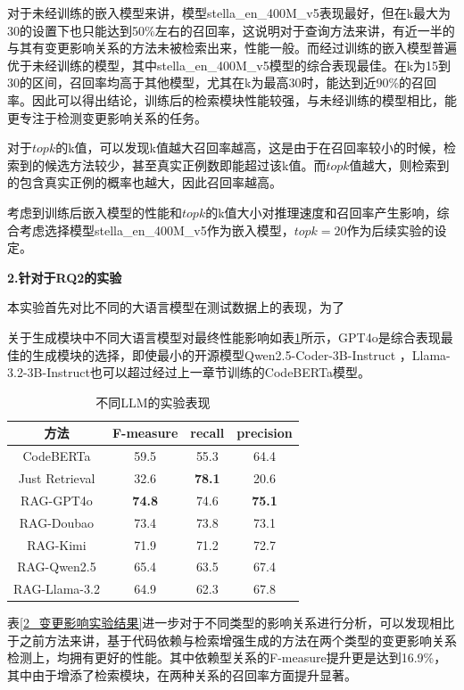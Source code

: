 对于未经训练的嵌入模型来讲，模型stella\_en\_400M\_v5表现最好，但在k最大为30的设置下也只能达到50\%左右的召回率，这说明对于查询方法来讲，有近一半的与其有变更影响关系的方法未被检索出来，性能一般。而经过训练的嵌入模型普遍优于未经训练的模型，其中stella\_en\_400M\_v5模型的综合表现最佳。在k为15到30的区间，召回率均高于其他模型，尤其在k为最高30时，能达到近90\%的召回率。因此可以得出结论，训练后的检索模块性能较强，与未经训练的模型相比，能更专注于检测变更影响关系的任务。

对于$topk$的k值，可以发现k值越大召回率越高，这是由于在召回率较小的时候，检索到的候选方法较少，甚至真实正例数即能超过该k值。而$topk$值越大，则检索到的包含真实正例的概率也越大，因此召回率越高。


考虑到训练后嵌入模型的性能和$topk$的k值大小对推理速度和召回率产生影响，综合考虑选择模型stella\_en\_400M\_v5作为嵌入模型，$topk=20$作为后续实验的设定。 

\textbf{2.针对于RQ2的实验}

本实验首先对比不同的大语言模型在测试数据上的表现，为了

关于生成模块中不同大语言模型对最终性能影响如表\ref{2_不同LLM的实验表现}所示，GPT4o是综合表现最佳的生成模块的选择，即使最小的开源模型Qwen2.5-Coder-3B-Instruct ，Llama-3.2-3B-Instruct也可以超过经过上一章节训练的CodeBERTa模型。

\begin{table}[htbp]
\caption{不同LLM的实验表现}
\label{2_不同LLM的实验表现}
\vspace{0.5em}\centering\wuhao
\begin{tabular}{cccc}
\toprule
方法 & F-measure & recall & precision  \\
\midrule
CodeBERTa & 59.5 & 55.3 & 64.4 \\
Just Retrieval & 32.6 & \textbf{78.1} & 20.6 \\
\midrule
RAG-GPT4o & \textbf{74.8} & 74.6 & \textbf{75.1} \\
RAG-Doubao & 73.4 & 73.8 & 73.1 \\
RAG-Kimi & 71.9 & 71.2 & 72.7 \\
RAG-Qwen2.5 & 65.4 & 63.5 & 67.4 \\
RAG-Llama-3.2 & 64.9 & 62.3 & 67.8 \\
\bottomrule
\end{tabular}
\end{table}


表\ref{2_变更影响实验结果}进一步对于不同类型的影响关系进行分析，可以发现相比于之前方法来讲，基于代码依赖与检索增强生成的方法在两个类型的变更影响关系检测上，均拥有更好的性能。其中依赖型关系的F-measure提升更是达到16.9\%，其中由于增添了检索模块，在两种关系的召回率方面提升显著。

